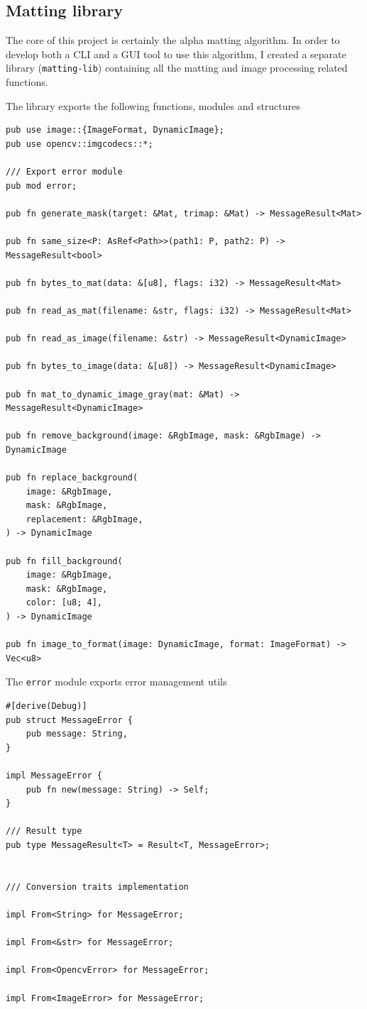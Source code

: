 \documentclass[a4paper]{article}
\begin{document}
\subsection{Matting library}

The core of this project is certainly the alpha \gls{matting} algorithm.
In order to develop both a \gls{CLI} and a \gls{GUI} tool to
use this algorithm, I created a separate library (\texttt{matting-lib})
containing all the \gls{matting} and image processing related functions.

The library exports the following functions, modules and structures

\begin{lstlisting}[style=Rust, style=boxed]
pub use image::{ImageFormat, DynamicImage};
pub use opencv::imgcodecs::*;

/// Export error module
pub mod error;

pub fn generate_mask(target: &Mat, trimap: &Mat) -> MessageResult<Mat>

pub fn same_size<P: AsRef<Path>>(path1: P, path2: P) -> MessageResult<bool>

pub fn bytes_to_mat(data: &[u8], flags: i32) -> MessageResult<Mat>

pub fn read_as_mat(filename: &str, flags: i32) -> MessageResult<Mat>

pub fn read_as_image(filename: &str) -> MessageResult<DynamicImage>

pub fn bytes_to_image(data: &[u8]) -> MessageResult<DynamicImage>

pub fn mat_to_dynamic_image_gray(mat: &Mat) -> MessageResult<DynamicImage>

pub fn remove_background(image: &RgbImage, mask: &RgbImage) -> DynamicImage

pub fn replace_background(
    image: &RgbImage,
    mask: &RgbImage,
    replacement: &RgbImage,
) -> DynamicImage

pub fn fill_background(
    image: &RgbImage,
    mask: &RgbImage,
    color: [u8; 4],
) -> DynamicImage

pub fn image_to_format(image: DynamicImage, format: ImageFormat) -> Vec<u8>
\end{lstlisting}

The \texttt{error} module exports error management utils

\begin{lstlisting}[style=Rust, style=boxed]
#[derive(Debug)]
pub struct MessageError {
    pub message: String,
}

impl MessageError {
    pub fn new(message: String) -> Self;
}

/// Result type
pub type MessageResult<T> = Result<T, MessageError>;


/// Conversion traits implementation

impl From<String> for MessageError;

impl From<&str> for MessageError;

impl From<OpencvError> for MessageError;

impl From<ImageError> for MessageError;
\end{lstlisting}
\end{document}
